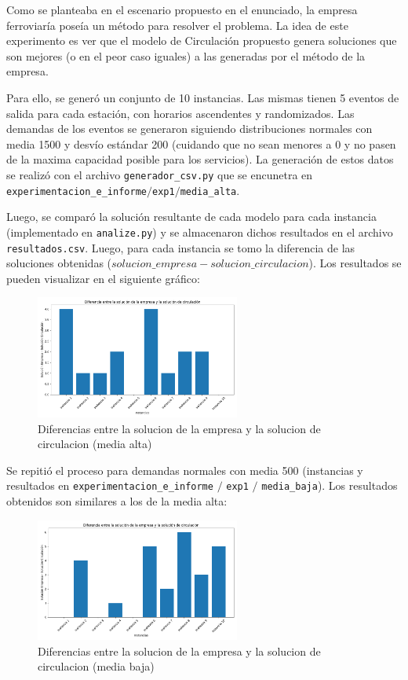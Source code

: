 \documentclass{article}
\begin{document}
Como se planteaba en el escenario propuesto en el enunciado, la empresa ferroviaría poseía un método para resolver el problema. La idea de este experimento es ver que el modelo de Circulación propuesto genera soluciones que son mejores (o en el peor caso iguales) a las generadas por el método de la empresa.

Para ello, se generó un conjunto de 10 instancias. Las mismas tienen 5 eventos de salida para cada estación, con horarios ascendentes y randomizados. Las demandas de los eventos se generaron siguiendo distribuciones normales con media 1500 y desvío estándar 200 (cuidando que no sean menores a 0 y no pasen de la maxima capacidad posible para los servicios). La generación de estos datos se realizó con el archivo \texttt{generador\_csv.py} que se encunetra en \texttt{experimentacion\_e\_informe}$/$\texttt{exp1}$/$\texttt{media\_alta}.

Luego, se comparó la solución resultante de cada modelo para cada instancia (implementado en \texttt{analize.py}) y se almacenaron dichos resultados en el archivo \texttt{resultados.csv}. Luego, para cada instancia se tomo la diferencia de las soluciones obtenidas ($solucion\_empresa - solucion\_circulacion$). Los resultados se pueden visualizar en el siguiente gráfico:

\begin{figure}[H]
    \centering
    \includegraphics[width=0.6\textwidth]{exp1/plot_mediaAlta.png}
    \caption{Diferencias entre la solucion de la empresa y la solucion de circulacion (media alta)}
    \label{fig:ejemplo}
\end{figure}

Se repitió el proceso para demandas normales con media 500 (instancias y resultados en \texttt{experimentacion\_e\_informe} $/$ \texttt{exp1} $/$ \texttt{media\_baja}). Los resultados obtenidos son similares a los de la media alta:

\begin{figure}[H]
    \centering
    \includegraphics[width=0.6\textwidth]{exp1/plot_mediaBaja.png}
    \caption{Diferencias entre la solucion de la empresa y la solucion de circulacion (media baja)}
    \label{fig:ejemplo}
\end{figure}
\end{document}
